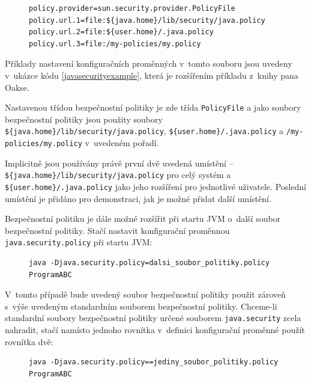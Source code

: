\begin{figure}[tbh]
\begin{lstlisting}[caption=Význačnější proměnné konfiguračního souboru {\tt java.security}, label=javasecurityexample]
policy.provider=sun.security.provider.PolicyFile
policy.url.1=file:${java.home}/lib/security/java.policy
policy.url.2=file:${user.home}/.java.policy
policy.url.3=file:/my-policies/my.policy
\end{lstlisting}
\end{figure}

Příklady nastavení konfiguračních proměnných v~tomto souboru jsou uvedeny v~ukázce kódu \ref{javasecurityexample}, která je rozšířením příkladu z~knihy pana Oakse. \cite{oaks}

Nastavenou třídou bezpečnostní politiky je zde třída {\tt PolicyFile} a jako soubory bezpečnostní politiky jsou použity
soubory {\tt \$\{java.home\}/lib/security/java.policy}, {\tt \$\{user{\linebreak}.home\}/.java.policy} a {\tt /my-policies/my.policy} v~uvedeném pořadí.

Implicitně jsou používány právě první dvě uvedená umístění -- {\tt \$\{java.home\}/lib/secu{\linebreak}rity/java.policy} pro celý systém a {\tt \$\{user.home\}/.java.policy} jako jeho rozšíření pro jednotlivé uživatele. Poslední umístění je přidáno pro demonstraci, jak je možné přidat další umístění. \cite{refSecurity}

Bezpečnostní politiku je dále možné rozšířit při startu JVM o~další soubor bezpečnostní politiky. Stačí nastavit konfigurační proměnnou {\tt java.security.policy} při startu JVM: \cite{oaks}

\begin{figure}[tbh]
\begin{lstlisting}[caption=Spuštění JVM s~vlastním souborem bezpečnostní politiky, label=nastaveniBP]
java -Djava.security.policy=dalsi_soubor_politiky.policy ProgramABC
\end{lstlisting}
\end{figure}

V~tomto případě bude uvedený soubor bezpečnostní politiky použit zároveň s~výše uvedeným standardním souborem bezpečnostní politiky. Chceme-li standardní soubory bezpečnostní politiky určené souborem {\tt java.security} zcela nahradit, stačí namísto jednoho rovnítka v~definici konfigurační proměnné použít rovnítka dvě: \cite{oaks}

\begin{figure}[tbh]
\begin{lstlisting}[caption=Spuštění JVM jen s~vlastním souborem bezpečnostní politiky, label=nastaveniBP2]
java -Djava.security.policy==jediny_soubor_politiky.policy ProgramABC
\end{lstlisting}
\end{figure}

